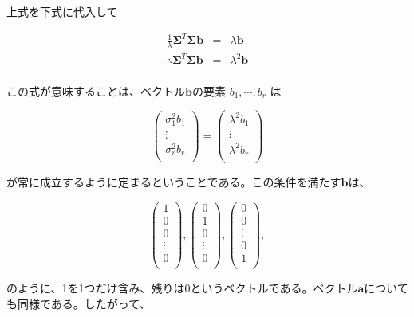 上式を下式に代入して

\begin{eqnarray*}
\frac{1}{\lambda} {\mathbf \Sigma}^T{\mathbf \Sigma}{\mathbf b} & = & \lambda {\mathbf b} \\
\therefore {\mathbf \Sigma}^T{\mathbf \Sigma}{\mathbf b} & = & \lambda^2 {\mathbf b} \\
\end{eqnarray*}

この式が意味することは、ベクトル\({\mathbf b}\)の要素 \(b_1 , \cdots , b_r\) は

\[
\left(
\begin{array}{c}
\sigma_1^2 b_1 \\ 
\vdots \\
\sigma_r^2 b_r \\
\end{array}
\right)
= 
\left(
\begin{array}{c}
\lambda^2 b_1 \\
\vdots \\
\lambda^2 b_r \\
\end{array}
\right)
\]

が常に成立するように定まるということである。この条件を満たす\({\mathbf b}\)は、

\[
\left(
\begin{array}{c}
1 \\
0 \\
0 \\
\vdots \\
0\\
\end{array}
\right)
,
\left(
\begin{array}{c}
0\\
1\\
0 \\
\vdots \\
0\\
\end{array}
\right)
,
\left(
\begin{array}{c}
0\\
0\\
\vdots\\
0\\
1\\
\end{array}
\right)
,
\]

のように、1を1つだけ含み、残りは0というベクトルである。ベクトル\({\mathbf a}\)についても同様である。したがって、

